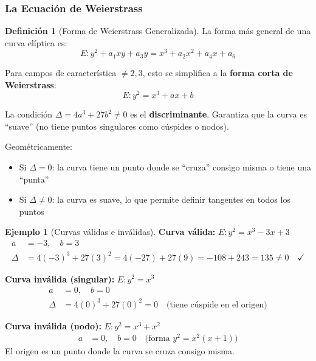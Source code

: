 \documentclass[11pt,a4paper,twoside,openright]{book}
\theoremstyle{definition}
\newtheorem{definition}{Definición}[chapter]
\newtheorem{example}{Ejemplo}[chapter]
\theoremstyle{plain}
\theoremstyle{remark}
\begin{document}
\subsubsection{La Ecuación de Weierstrass}

\begin{definition}[Forma de Weierstrass Generalizada]
La forma más general de una curva elíptica es:
\[
E: y^2 + a_1 xy + a_3 y = x^3 + a_2 x^2 + a_4 x + a_6
\]

Para campos de característica $\neq 2, 3$, esto se simplifica a la \textbf{forma corta de Weierstrass}:
\[
E: y^2 = x^3 + ax + b
\]
\end{definition}

\begin{mathnote}
La condición $\Delta = 4a^3 + 27b^2 \neq 0$ es el \textbf{discriminante}. Garantiza que la curva es ``suave'' (no tiene puntos singulares como cúspides o nodos).

Geométricamente:
\begin{itemize}
    \item Si $\Delta = 0$: la curva tiene un punto donde se ``cruza'' consigo misma o tiene una ``punta''
    \item Si $\Delta \neq 0$: la curva es suave, lo que permite definir tangentes en todos los puntos
\end{itemize}
\end{mathnote}

\begin{example}[Curvas válidas e inválidas]
\textbf{Curva válida:} $E: y^2 = x^3 - 3x + 3$
\begin{align}
a &= -3, \quad b = 3 \\
\Delta &= 4(-3)^3 + 27(3)^2 = 4(-27) + 27(9) = -108 + 243 = 135 \neq 0 \quad \checkmark
\end{align}

\textbf{Curva inválida (singular):} $E: y^2 = x^3$
\begin{align}
a &= 0, \quad b = 0 \\
\Delta &= 4(0)^3 + 27(0)^2 = 0 \quad \text{(tiene cúspide en el origen)}
\end{align}

\textbf{Curva inválida (nodo):} $E: y^2 = x^3 + x^2$
\begin{align}
a &= 0, \quad b = 0 \quad \text{(forma } y^2 = x^2(x+1) \text{)}
\end{align}
El origen es un punto donde la curva se cruza consigo misma.
\end{example}
\end{document}
